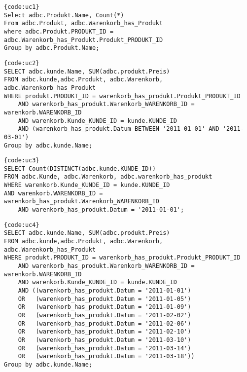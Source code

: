 \begin{lstlisting}[caption=Testabfrage 1, firstnumber=1]{code:uc1}
Select adbc.Produkt.Name, Count(*)
From adbc.Produkt, adbc.Warenkorb_has_Produkt
where adbc.Produkt.PRODUKT_ID = adbc.Warenkorb_has_Produkt.Produkt_PRODUKT_ID
Group by adbc.Produkt.Name;
\end{lstlisting}

\begin{lstlisting}[caption=Testabfrage 2, firstnumber=1]{code:uc2}
SELECT adbc.kunde.Name, SUM(adbc.produkt.Preis)
FROM adbc.kunde,adbc.Produkt, adbc.Warenkorb, adbc.Warenkorb_has_Produkt
WHERE produkt.PRODUKT_ID = warenkorb_has_produkt.Produkt_PRODUKT_ID 
    AND warenkorb_has_produkt.Warenkorb_WARENKORB_ID = warenkorb.WARENKORB_ID
    AND warenkorb.Kunde_KUNDE_ID = kunde.KUNDE_ID    
    AND (warenkorb_has_produkt.Datum BETWEEN '2011-01-01' AND '2011-03-01')
Group by adbc.kunde.Name;
\end{lstlisting}

\begin{lstlisting}[caption=Testabfrage 3, firstnumber=1]{code:uc3}
SELECT Count(DISTINCT(adbc.kunde.KUNDE_ID))
FROM adbc.Kunde, adbc.Warenkorb, adbc.warenkorb_has_produkt
WHERE warenkorb.Kunde_KUNDE_ID = kunde.KUNDE_ID
AND warenkorb.WARENKORB_ID = warenkorb_has_produkt.Warenkorb_WARENKORB_ID
    AND warenkorb_has_produkt.Datum = '2011-01-01';
\end{lstlisting}

\begin{lstlisting}[caption=Testabfrage 4, firstnumber=1]{code:uc4}
SELECT adbc.kunde.Name, SUM(adbc.produkt.Preis)
FROM adbc.kunde,adbc.Produkt, adbc.Warenkorb, adbc.Warenkorb_has_Produkt
WHERE produkt.PRODUKT_ID = warenkorb_has_produkt.Produkt_PRODUKT_ID 
    AND warenkorb_has_produkt.Warenkorb_WARENKORB_ID = warenkorb.WARENKORB_ID
    AND warenkorb.Kunde_KUNDE_ID = kunde.KUNDE_ID
    AND ((warenkorb_has_produkt.Datum = '2011-01-01')
    OR   (warenkorb_has_produkt.Datum = '2011-01-05')
    OR   (warenkorb_has_produkt.Datum = '2011-01-09')    
    OR   (warenkorb_has_produkt.Datum = '2011-02-02')
    OR   (warenkorb_has_produkt.Datum = '2011-02-06')    
    OR   (warenkorb_has_produkt.Datum = '2011-02-10')
    OR   (warenkorb_has_produkt.Datum = '2011-03-10')
    OR   (warenkorb_has_produkt.Datum = '2011-03-14')    
    OR   (warenkorb_has_produkt.Datum = '2011-03-18'))      
Group by adbc.kunde.Name;
\end{lstlisting}

